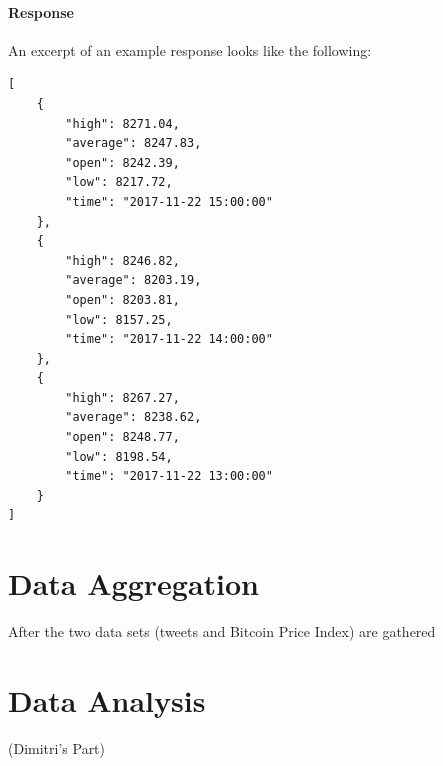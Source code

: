 \documentclass[a4paper,12pt]{article}
\begin{document}
\begin{spacing}{1.2}
\paragraph{Response}
An excerpt of an example response looks like the following:
\begin{lstlisting}
[
    {
        "high": 8271.04, 
        "average": 8247.83, 
        "open": 8242.39,
        "low": 8217.72, 
        "time": "2017-11-22 15:00:00"
    }, 
    {
        "high": 8246.82,
        "average": 8203.19,
        "open": 8203.81,
        "low": 8157.25,
        "time": "2017-11-22 14:00:00"
    }, 
    {
        "high": 8267.27, 
        "average": 8238.62, 
        "open": 8248.77, 
        "low": 8198.54, 
        "time": "2017-11-22 13:00:00"
    }
]
\end{lstlisting}


\section{Data Aggregation}
After the two data sets (tweets and Bitcoin Price Index) are gathered


\section{Data Analysis}
(Dimitri's Part)


\end{spacing}
\clearpage

\printbibliography
\clearpage

\end{document}
